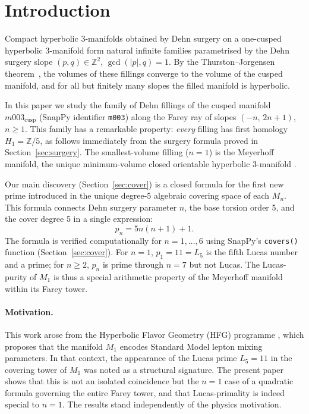 \documentclass[11pt,a4paper]{article}
\theoremstyle{definition}
\newcommand{\ZZ}{\mathbb{Z}}
\newcommand{\Zfive}{\ZZ/5}
\newcommand{\Mn}{M_n}
\newcommand{\Mcusp}{m003_{\mathrm{cusp}}}
\begin{document}
\section{Introduction}
\label{sec:intro}

Compact hyperbolic 3-manifolds obtained by Dehn surgery on a
one-cusped hyperbolic 3-manifold form natural infinite families
parametrised by the Dehn surgery slope $(p,q) \in \ZZ^2$,
$\gcd(|p|,q)=1$.
By the Thurston--Jorgensen theorem~\cite{Thurston78}, the volumes
of these fillings converge to the volume of the cusped manifold,
and for all but finitely many slopes the filled manifold is hyperbolic.

In this paper we study the family of Dehn fillings of the cusped
manifold $\Mcusp$ (SnapPy identifier \texttt{m003}) along the
Farey ray of slopes $(-n,\,2n+1)$, $n \geq 1$.
This family has a remarkable property: \emph{every} filling has
first homology $H_1 = \Zfive$, as follows immediately from the
surgery formula proved in Section~\ref{sec:surgery}.
The smallest-volume filling ($n=1$) is the Meyerhoff manifold,
the unique minimum-volume closed orientable hyperbolic 3-manifold
\cite{GMM2009}.

Our main discovery (Section~\ref{sec:cover}) is a closed formula
for the first new prime introduced in the unique degree-5 algebraic
covering space of each $\Mn$.
This formula connects Dehn surgery parameter $n$, the base torsion
order 5, and the cover degree 5 in a single expression:
\[
  p_n = 5n(n+1)+1.
\]
The formula is verified computationally for $n = 1,\ldots,6$
using SnapPy's \texttt{covers()} function
(Section~\ref{sec:cover}).
For $n=1$, $p_1 = 11 = L_5$ is the fifth Lucas number and a prime;
for $n \geq 2$, $p_n$ is prime through $n=7$ but not Lucas.
The Lucas-purity of $M_1$ is thus a special arithmetic property
of the Meyerhoff manifold within its Farey tower.

\paragraph{Motivation.}
This work arose from the Hyperbolic Flavor Geometry (HFG) programme
\cite{Gentry:Unified}, which proposes that the manifold $M_1$ encodes
Standard Model lepton mixing parameters.
In that context, the appearance of the Lucas prime $L_5 = 11$ in the
covering tower of $M_1$ was noted as a structural signature.
The present paper shows that this is not an isolated coincidence but
the $n=1$ case of a quadratic formula governing the entire Farey tower,
and that Lucas-primality is indeed special to $n=1$.
The results stand independently of the physics motivation.
\end{document}
